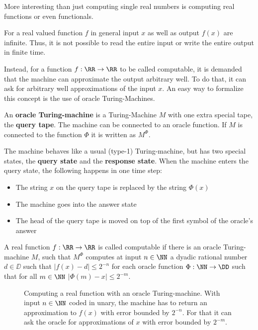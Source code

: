 More interesting than just computing single real numbers is computing real
functions or even functionals.

For a real valued function $f$ in general input $x$ as well as
output $f(x)$ are infinite. 
Thus, it is not possible to read the entire input or write the entire output in
finite time.

Instead, for a function $f: \RR \to \RR$ to be called computable, it is
demanded that the machine can approximate the output arbitrary well.
To do that, it can ask for arbitrary well approximations of the input $x$.
An easy way to formalize this concept is the use of oracle Turing-Machines.
\begin{definition}\label{def:computability_oracle_tm}
 An \textbf{oracle Turing-machine} is a Turing-Machine $M$ with one extra special
 tape, the \textbf{query tape}. The machine can be connected to an oracle
 function.
 If $M$ is connected to the function $\Phi$ it is written as $M^\Phi$. 

 The machine behaves like a usual (type-1) Turing-machine, but has two special
 states, the \textbf{query state} and the \textbf{response state}. 
 When the machine enters the query state, the following happens in one time
 step: 
 \begin{itemize}
    \item The string $x$ on the query tape is replaced by the string $\Phi(x)$
    \item The machine goes into the answer state
    \item The head of the query tape is moved on top of the first symbol of the
      oracle's answer
  \end{itemize}

 A real function $f: \RR \to \RR$ is called computable if there is an oracle
 Turing-machine $M$, such that $M^\Phi$ computes at input $n \in \NN$ a dyadic rational
 number $d \in \DD$ such that $| f(x) - d | \leq 2^{-n}$ for each oracle function
 $\Phi: \NN \to \DD$ such that for all $m \in \NN$ $|\Phi(m) - x| \leq 2^{-m}$.   
\end{definition}
\begin{figure}
  \centering
  
  \caption{Computing a real function with an oracle Turing-machine. With input
  $n \in \NN$ coded in unary, the machine has to return an approximation to
  $f(x)$ with error bounded by $2^{-n}$. For that it can ask the oracle for
  approximations of $x$ with error bounded by $2^{-m}$.
  }
\end{figure}

